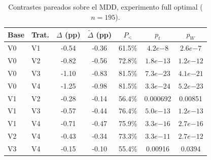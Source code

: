 \begin{table}[ht]
  \centering
  \caption{Contrastes pareados sobre el MDD, experimento full optimal ($n=195$).}
  \label{tab:contrasts_optimal}
  \begin{tabular}{llccccc}
    \toprule
    Base & Trat. & $\Delta$ (pp) & $\tilde{\Delta}$ (pp) & $P_{<}$ & $p_t$ & $p_W$ \\
    \midrule
    V0 & V1 & -0.54 & -0.36 & 61.5\% & $4.2e{-8}$ & $2.6e{-7}$ \\
    V0 & V2 & -0.82 & -0.56 & 72.8\% & $1.8e{-13}$ & $1.2e{-12}$ \\
    V0 & V3 & -1.10 & -0.83 & 81.5\% & $7.3e{-23}$ & $4.1e{-21}$ \\
    V0 & V4 & -1.25 & -0.98 & 81.5\% & $3.3e{-24}$ & $5.2e{-23}$ \\
    V1 & V2 & -0.28 & -0.14 & 56.4\% & 0.000692 & 0.00851 \\
    V1 & V3 & -0.57 & -0.44 & 76.4\% & $5.0e{-13}$ & $1.2e{-13}$ \\
    V1 & V4 & -0.71 & -0.47 & 75.9\% & $3.3e{-16}$ & $2.7e{-16}$ \\
    V2 & V4 & -0.43 & -0.34 & 73.3\% & $3.3e{-11}$ & $2.7e{-12}$ \\
    V3 & V4 & -0.15 & -0.10 & 55.4\% & 0.00916 & 0.0394 \\
    \bottomrule
  \end{tabular}
\end{table}
